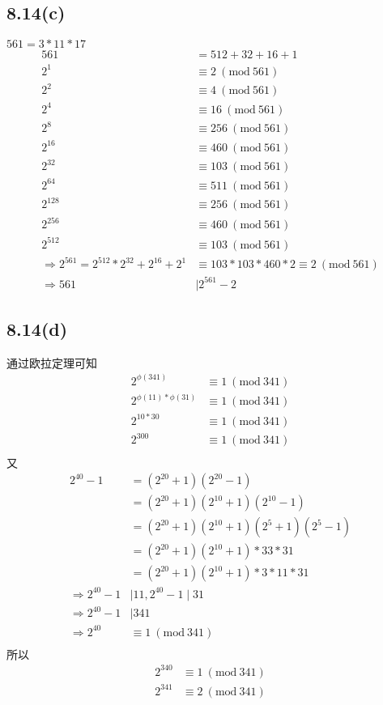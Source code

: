 \documentclass[acmlarge,screen]{acmart}
\begin{document}
\subsection{8.14(c)}
$561=3*11*17$
\begin{align*}
	561&=512+32+16+1\\
	2^{1}&\equiv2\ (\text{mod}\ 561)\\
	2^{2}&\equiv4\ (\text{mod}\ 561)\\
	2^{4}&\equiv16\ (\text{mod}\ 561)\\
	2^{8}&\equiv256\ (\text{mod}\ 561)\\
	2^{16}&\equiv460\ (\text{mod}\ 561)\\
	2^{32}&\equiv103\ (\text{mod}\ 561)\\	
	2^{64}&\equiv511\ (\text{mod}\ 561)\\
	2^{128}&\equiv256\ (\text{mod}\ 561)\\
	2^{256}&\equiv460\ (\text{mod}\ 561)\\
	2^{512}&\equiv103\ (\text{mod}\ 561)\\
	\Rightarrow 2^{561}=2^{512} * 2^{32} + 2^{16} + 2^{1}&\equiv103 * 103 * 460 * 2\equiv2\ (\text{mod}\ 561)\\
	\Rightarrow 561 &\mid 2^{561} - 2
\end{align*}
\subsection{8.14(d)}
通过欧拉定理可知
\begin{align*}
	2^{\phi(341)}&\equiv1\ (\text{mod}\ 341)\\
	2^{\phi(11) * \phi(31)}&\equiv1\ (\text{mod}\ 341)\\
	2^{10*30}&\equiv1\ (\text{mod}\ 341)\\
	2^{300}&\equiv1\ (\text{mod}\ 341)\\
\end{align*}
又
\begin{align*}
	2^{40}-1&=(2^{20}+1)(2^{20}-1)\\
	&=(2^{20}+1)(2^{10}+1)(2^{10}-1)\\
	&=(2^{20}+1)(2^{10}+1)(2^{5}+1)(2^{5}-1)\\
	&=(2^{20}+1)(2^{10}+1)*33*31\\
	&=(2^{20}+1)(2^{10}+1)*3*11*31\\
	\Rightarrow 2^{40}-1 &\mid 11,  2^{40}-1 \mid 31\\
	\Rightarrow 2^{40}-1 &\mid 341\\
	\Rightarrow 2^{40}&\equiv1\ (\text{mod}\ 341)\\
\end{align*}
所以
\begin{align*}
2^{340}&\equiv1\ (\text{mod}\ 341)\\
2^{341}&\equiv2\ (\text{mod}\ 341)\\	
\end{align*}
\end{document}
